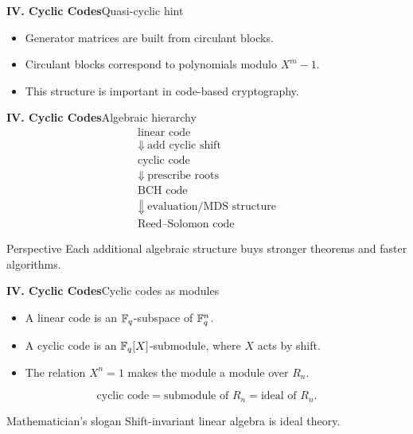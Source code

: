 \begin{frame}{\textbf{IV. Cyclic Codes}}{Quasi-cyclic hint}
\small
{}
\begin{itemize}
  \item Generator matrices are built from circulant blocks.
  \item Circulant blocks correspond to polynomials modulo $X^m-1$.
  \item This structure is important in code-based cryptography.
\end{itemize}
\end{frame}

\begin{frame}{\textbf{IV. Cyclic Codes}}{Algebraic hierarchy}
\small
\[
\begin{array}{c}
\text{linear code}\\
\Downarrow\ \text{add cyclic shift}\\
\text{cyclic code}\\
\Downarrow\ \text{prescribe roots}\\
\text{BCH code}\\
\Downarrow\ \text{evaluation/MDS structure}\\
\text{Reed--Solomon code}
\end{array}
\]
\begin{block}{Perspective}
Each additional algebraic structure buys stronger theorems and faster algorithms.
\end{block}
\end{frame}

\begin{frame}{\textbf{IV. Cyclic Codes}}{Cyclic codes as modules}
\small
\begin{itemize}
  \item A linear code is an $\mathbb{F}_q$-subspace of $\mathbb{F}_q^n$.
  \item A cyclic code is an $\mathbb{F}_q[X]$-submodule, where $X$ acts by shift.
  \item The relation $X^n=1$ makes the module a module over $R_n$.
\end{itemize}
\[
  \text{cyclic code}=\text{submodule of }R_n=\text{ideal of }R_n.
\]
\begin{block}{Mathematician's slogan}
Shift-invariant linear algebra is ideal theory.
\end{block}
\end{frame}

